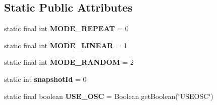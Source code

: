 \subsection*{Static Public Attributes}
\begin{DoxyCompactItemize}
\item 
\hypertarget{classdev_1_1boxy_1_1fortyfive_1_1core_1_1presentation_1_1_linear_presentation_ab4724959f6f3e4d9e1dd9da37112c97e}{
static final int {\bfseries MODE\_\-REPEAT} = 0}
\label{db/dad/classdev_1_1boxy_1_1fortyfive_1_1core_1_1presentation_1_1_linear_presentation_ab4724959f6f3e4d9e1dd9da37112c97e}

\item 
\hypertarget{classdev_1_1boxy_1_1fortyfive_1_1core_1_1presentation_1_1_linear_presentation_ad4bf65de2597aac196d33fb1fedb984e}{
static final int {\bfseries MODE\_\-LINEAR} = 1}
\label{db/dad/classdev_1_1boxy_1_1fortyfive_1_1core_1_1presentation_1_1_linear_presentation_ad4bf65de2597aac196d33fb1fedb984e}

\item 
\hypertarget{classdev_1_1boxy_1_1fortyfive_1_1core_1_1presentation_1_1_linear_presentation_a69e65880723038ba7614bcf1b9d6d971}{
static final int {\bfseries MODE\_\-RANDOM} = 2}
\label{db/dad/classdev_1_1boxy_1_1fortyfive_1_1core_1_1presentation_1_1_linear_presentation_a69e65880723038ba7614bcf1b9d6d971}

\item 
\hypertarget{classdev_1_1boxy_1_1fortyfive_1_1core_1_1presentation_1_1_linear_presentation_a51ee46f7f3c9c3604061ad1856165125}{
static int {\bfseries snapshotId} = 0}
\label{db/dad/classdev_1_1boxy_1_1fortyfive_1_1core_1_1presentation_1_1_linear_presentation_a51ee46f7f3c9c3604061ad1856165125}

\item 
\hypertarget{classdev_1_1boxy_1_1fortyfive_1_1core_1_1presentation_1_1_linear_presentation_a0375d4f65d144640ed401c2d31b9c2a0}{
static final boolean {\bfseries USE\_\-OSC} = Boolean.getBoolean(\char`\"{}USEOSC\char`\"{})}
\label{db/dad/classdev_1_1boxy_1_1fortyfive_1_1core_1_1presentation_1_1_linear_presentation_a0375d4f65d144640ed401c2d31b9c2a0}

\end{DoxyCompactItemize}
